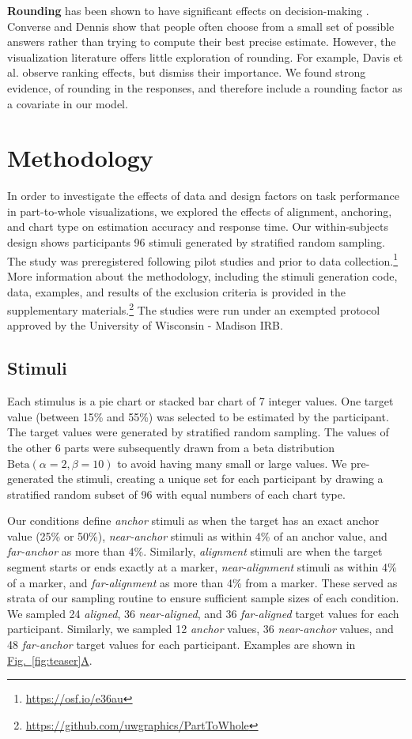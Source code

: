 \documentclass[preprint]{vgtc}               %
\newcommand{\subfigref}[2]{\hyperref[#1]{Fig.~\ref*{#1}#2}}
\begin{document}
\textbf{Rounding} has been shown to have significant effects on decision-making \cite{allen2017ReferenceDependentPreferencesEvidence}. 
Converse and Dennis \cite{converse2018RoleProminentNumbers} show that people often choose from a small set of possible answers rather than trying to compute their best precise estimate. 
However, the visualization literature offers little exploration of rounding. 
For example, Davis et al. \cite{davis2024RisksRankingRevisiting} observe ranking effects, but dismiss their importance. 
We found strong evidence, of rounding in the responses, and therefore include a rounding factor as a covariate in our model.

\section{Methodology}
In order to investigate the effects of data and design factors on task performance in part-to-whole visualizations, we explored the effects of alignment, anchoring, and chart type on estimation accuracy and response time.
Our within-subjects design shows participants 96 stimuli generated by stratified random sampling.
The study was preregistered following pilot studies and prior to data collection.\footnote{\url{https://osf.io/e36au}} More information about the methodology, including the stimuli generation code, data, examples, and results of the exclusion criteria is provided in the supplementary materials.\footnote{\url{https://github.com/uwgraphics/PartToWhole}}
The studies were run under an exempted protocol approved by the University of Wisconsin - Madison IRB.

\subsection{Stimuli}
\label{sec:stimuli}
Each stimulus is a pie chart or stacked bar chart of 7 integer values.
One target value (between 15\% and 55\%) was selected to be estimated by the participant.
The target values were generated by stratified random sampling.
The values of the other 6 parts were subsequently drawn from a beta distribution $\text{Beta}(\alpha=2, \beta=10)$ to avoid having many small or large values.
We pre-generated the stimuli, creating a unique set for each participant by drawing a stratified random subset of 96 with equal numbers of each chart type.

Our conditions define \emph{anchor} stimuli as when the target has an exact anchor value (25\% or 50\%), \emph{near-anchor} stimuli as within 4\% of an anchor value, and \emph{far-anchor} as more than 4\%.
Similarly, \emph{alignment} stimuli are when the target segment starts or ends exactly at a marker, \emph{near-alignment} stimuli as within 4\% of a marker, and \emph{far-alignment} as more than 4\% from a marker.
These served as strata of our sampling routine to ensure sufficient sample sizes of each condition.
We sampled 24 \emph{aligned}, 36 \emph{near-aligned}, and 36 \emph{far-aligned} target values for each participant.
Similarly, we sampled 12 \emph{anchor} values, 36 \emph{near-anchor} values, and 48 \emph{far-anchor} target values for each participant.
Examples are shown in \subfigref{fig:teaser}{A}.
\end{document}
